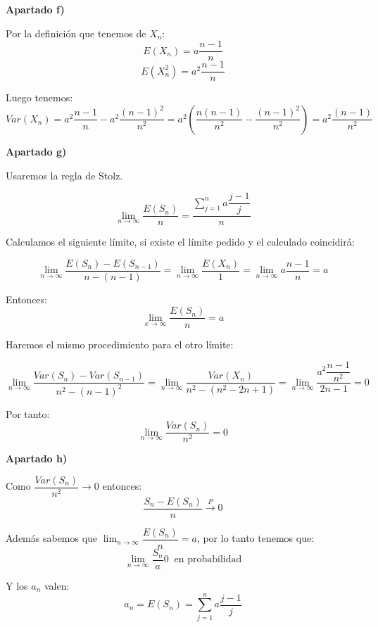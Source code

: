 \documentclass[openany]{book}
\begin{document}
\begin{exercise}
\begin{flushright}
    \textbf{Apartado f)}
\end{flushright}
Por la definición que tenemos de $ X_n $:
$$ E(X_n) = a \dfrac{n-1}{n} $$
$$ E(X_n^2) = a^2 \dfrac{n-1}{n} $$

Luego tenemos:
$$ Var(X_n) = a^2 \dfrac{n-1}{n}-a^2 \dfrac{(n-1)^2}{n^2} = a^2 \left( \dfrac{n(n-1)}{n^2} - \dfrac{(n-1)^2}{n^2} \right) = a^2 \dfrac{(n-1)}{n^2} $$
\begin{flushright}
    \textbf{Apartado g)}
\end{flushright}

Usaremos la regla de Stolz.

$$ \lim_{n \to \infty} \dfrac{E(S_n)}{n} = \dfrac{\sum\limits_{j=1}^{n}a \dfrac{j-1}{j}}{n} $$

Calculamos el siguiente límite, si existe el límite pedido y el calculado coincidirá:

$$\lim_{n \to \infty} \dfrac{E(S_n)-E(S_{n-1})}{n-(n-1)} = \lim_{n \to \infty} \dfrac{E(X_n)}{1} = \lim_{n \to \infty}a \dfrac{n-1}{n} = a$$

Entonces:
$$ \lim_{x \to \infty} \dfrac{E(S_n)}{n} = a $$

Haremos el mismo procedimiento para el otro límite:

$$ \lim_{n \to \infty} \dfrac{Var(S_n)-Var(S_{n-1})}{n^2-(n-1)^2} = \lim_{n \to \infty} \dfrac{Var(X_n)}{n^2-(n^2-2n+1)} = \lim_{n \to \infty} \dfrac{a^2 \dfrac{n-1}{n^2}}{2n-1} = 0$$

Por tanto:
$$ \lim_{n \to \infty} \dfrac{Var(S_n)}{n^2} = 0 $$


\begin{flushright}
    \textbf{Apartado h)}
\end{flushright}

Como $ \dfrac{Var(S_n)}{n^2}\to 0  $ entonces:
$$ \dfrac{S_n-E(S_n)}{n} \xrightarrow{P}0 $$

Además sabemos que $ \lim_{n \to \infty} \dfrac{E(S_n)}{n} = a $, por lo tanto tenemos que:
$$ \lim_{n \to \infty} \dfrac{S_n}{a} 0\ \text{ en probabilidad} $$

Y los $ a_n $ valen:
$$ a_n = E(S_n ) = \sum\limits_{j=1}^{n}a \dfrac{j-1}{j} $$

\end{exercise}

\newpage
\end{document}
